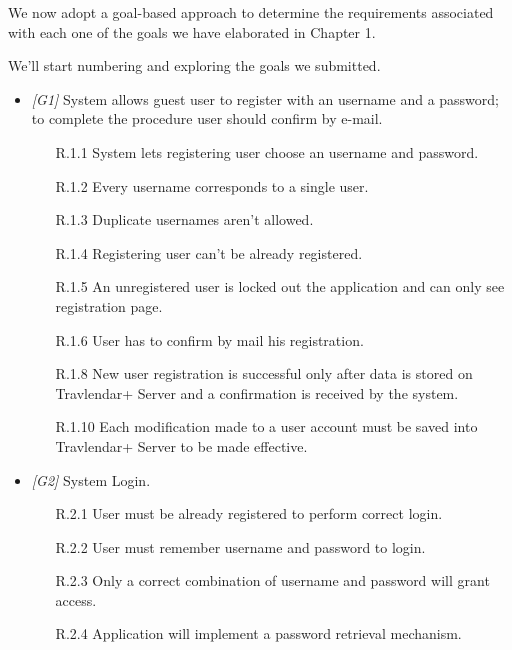 We now adopt a goal-based approach to determine the requirements associated with each one of the goals we have elaborated in Chapter 1.

We'll start numbering and exploring the goals we submitted.

\begin{itemize}
	
	\item \textit{[G1]} System allows guest user to register with an username and a password; to complete the procedure user should confirm by e-mail.
		\begin{itemize}
			\item [R.1.1] System lets registering user choose an username and password.
			\item [R.1.2] Every username corresponds to a single user.
			\item [R.1.3] Duplicate usernames aren’t allowed.
			\item [R.1.4] Registering user can't be already registered.
			\item [R.1.5] An unregistered user is locked out the application and can only see registration page.
			\item [R.1.6] User has to confirm by mail his registration.
			\item [R.1.8] New user registration is successful only after data is stored on Travlendar+ Server and a confirmation is received by the system.
			\item [R.1.10] Each modification made to a user account must be saved into Travlendar+ Server to be made effective.
		\end{itemize}
             
	
	\item \textit{[G2]} System Login.
		 \begin{itemize}
		 	\item [R.2.1] User must be already registered to perform correct login.
		 	\item [R.2.2] User must remember username and password to login.
             \item [R.2.3] Only a correct combination of username and password will grant access.
             \item [R.2.4] Application will implement a password retrieval mechanism.
		\end{itemize}
                  


\end{itemize}
